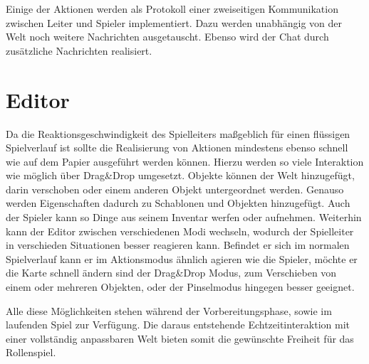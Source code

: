 Einige der Aktionen werden als Protokoll einer zweiseitigen Kommunikation zwischen Leiter und Spieler implementiert. Dazu werden unabhängig von der Welt noch weitere Nachrichten ausgetauscht. Ebenso wird der Chat durch zusätzliche Nachrichten realisiert.

\section{Editor}
\label{sec:Editor}
Da die Reaktionsgeschwindigkeit des Spielleiters maßgeblich für einen flüssigen Spielverlauf ist sollte die Realisierung von Aktionen mindestens ebenso schnell wie auf dem Papier ausgeführt werden können.\newline
Hierzu werden so viele Interaktion wie möglich über Drag\&Drop umgesetzt. Objekte können der Welt hinzugefügt, darin verschoben oder einem anderen Objekt untergeordnet werden. Genauso werden Eigenschaften dadurch zu Schablonen und Objekten hinzugefügt. Auch der Spieler kann so Dinge aus seinem Inventar werfen oder aufnehmen.\newline
Weiterhin kann der Editor zwischen verschiedenen Modi wechseln, wodurch der Spielleiter in verschieden Situationen besser reagieren kann. Befindet er sich im normalen Spielverlauf kann er im Aktionsmodus ähnlich agieren wie die Spieler, möchte er die Karte schnell ändern sind der Drag\&Drop Modus, zum Verschieben von einem oder mehreren Objekten, oder der Pinselmodus hingegen besser geeignet.

Alle diese Möglichkeiten stehen während der Vorbereitungsphase, sowie im laufenden Spiel zur Verfügung. Die daraus entstehende Echtzeitinteraktion mit einer vollständig anpassbaren Welt bieten somit die gewünschte Freiheit für das Rollenspiel.